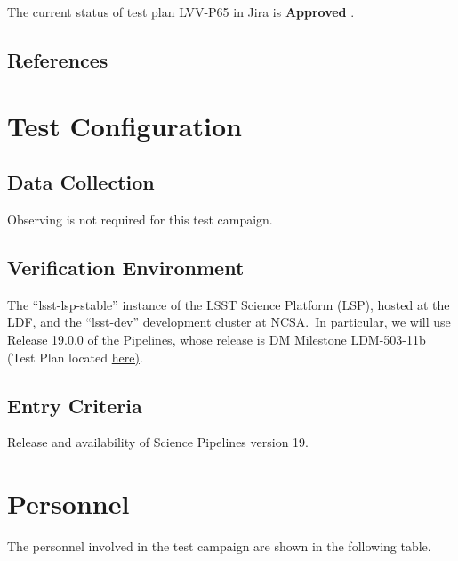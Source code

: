 \documentclass[DM,lsstdraft,STR,toc]{lsstdoc}
\begin{document}
The current status of test plan LVV-P65 in Jira is \textbf{ Approved }.

\subsection{References}
\label{sect:references}
\renewcommand{\refname}{}

\section{Test Configuration}
\label{sect:configuration}

\subsection{Data Collection}

  Observing is not required for this test campaign.

\subsection{Verification Environment}
\label{sect:hwconf}
   The ``lsst-lsp-stable'' instance of the LSST Science Platform (LSP),
hosted at the LDF, and the ``lsst-dev'' development cluster at NCSA.~In
particular, we will use Release 19.0.0 of the Pipelines, whose release
is DM Milestone LDM-503-11b (Test Plan located
\href{https://jira.lsstcorp.org/secure/Tests.jspa\#/testPlan/LVV-P62}{here)}.


  \subsection{Entry Criteria}
   Release and availability of Science Pipelines version 19.




\newpage
\section{Personnel}
\label{sect:personnel}

The personnel involved in the test campaign are shown in the following table.
\end{document}
